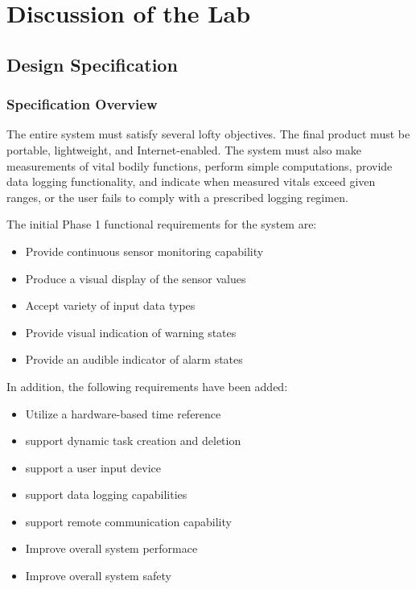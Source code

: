 \documentclass[12pt]{article} %
\begin{document}
\section{Discussion of the Lab}

\subsection{Design Specification\label{sec:designSpec}} 

\subsubsection{Specification Overview}
The entire system must satisfy several lofty objectives. The final product must
be portable, lightweight, and Internet-enabled. The system must also make
measurements of vital bodily functions, perform simple computations, provide
data logging functionality, and indicate when measured vitals exceed given
ranges, or the user fails to comply with a prescribed logging regimen. \\

\begin{itemize}[$$]
  \item The initial Phase 1 functional requirements for the system are:
    \begin{itemize}[$\bullet$]
      \item Provide continuous sensor monitoring capability
      \item Produce a visual display of the sensor values
      \item Accept variety of input data types
      \item Provide visual indication of warning states
      \item Provide an audible indicator of alarm states
    \end{itemize}
  \item In addition, the following requirements have been added:
    \begin{itemize}[$\bullet$]
      \item Utilize a hardware-based time reference
      \item support dynamic task creation and deletion
      \item support a user input device
      \item support data logging capabilities
      \item support remote communication capability
      \item Improve overall system performace
      \item Improve overall system safety
    \end{itemize}
\end{itemize}
\end{document}
